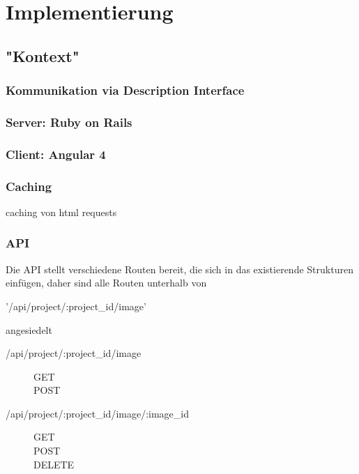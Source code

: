\section{Implementierung}
\label{sec:implementation-analysis}

\subsection{"Kontext"}



\subsubsection{Kommunikation via Description Interface}



\subsubsection{Server: Ruby on Rails}



\subsubsection{Client: Angular 4}



\subsubsection{Caching}

\TODO caching von html requests


\subsubsection{API}

Die API stellt verschiedene Routen bereit, die sich in das existierende
Strukturen einfügen, daher sind alle Routen unterhalb von
\begin{description}
  \item ['/api/project/:project_id/image']
\end{description}
angesiedelt

\begin{description}
  \item [/api/project/:project_id/image]
    \begin{description}
    \item [GET]
    \item [POST]
    \end{description}
  \item [/api/project/:project_id/image/:image_id]
    \begin{description}
    \item [GET]
    \item[POST]
    \item[DELETE]
    \end{description}

\end{description}

